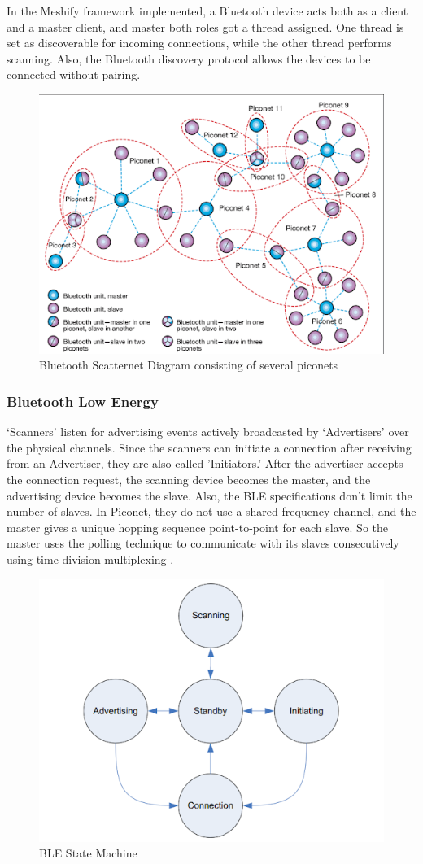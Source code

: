 \documentclass[12pt, conference, onecolumn, a4paper]{IEEEtran}
\begin{document}
In the Meshify framework implemented, a Bluetooth device acts both as a client
and a master client, and master both roles got a thread
assigned\cite{gunasekara2022}. One thread is set as discoverable for incoming
connections, while the other thread performs scanning. Also, the Bluetooth
discovery protocol allows the devices to be connected without pairing.

\begin{figure}[htbp]
    \centerline{\includegraphics[height=0.45\textwidth]{imgs/piconetbl.png}}
    \caption{Bluetooth Scatternet Diagram consisting of several piconets}
    \label{piconetbl}
\end{figure}

\subsubsection{Bluetooth Low Energy}

‘Scanners’ listen for advertising events actively broadcasted by ‘Advertisers’
over the physical channels. Since the scanners can initiate a connection after
receiving from an Advertiser, they are also called 'Initiators.' After the
advertiser accepts the connection request, the scanning device becomes the
master, and the advertising device becomes the slave. Also, the BLE
specifications don't limit the number of slaves. In Piconet, they do not use a
shared frequency channel, and the master gives a unique hopping sequence
point-to-point for each slave. So the master uses the polling technique to
communicate with its slaves consecutively using time division multiplexing
\cite{todtenberg2019}.

\begin{figure}[htbp]
    \centerline{\includegraphics[height=0.45\textwidth]{imgs/blstatemach.png}}
    \caption{BLE State Machine}
    \label{blstatemach}
\end{figure}
\end{document}
